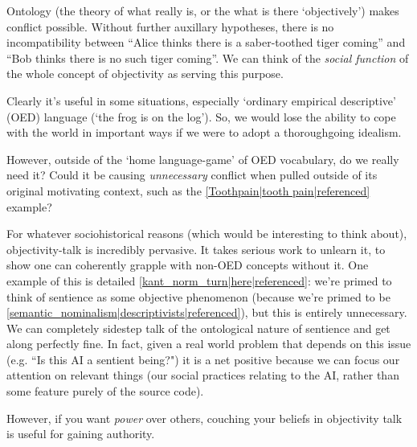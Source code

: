 Ontology (the theory of what really is, or the what is there `objectively') makes conflict possible. Without further auxillary hypotheses, there is no incompatibility between ``Alice thinks there is a saber-toothed tiger coming'' and ``Bob thinks there is no such tiger coming''. We can think of the \emph{social function} of the whole concept of objectivity as serving this purpose.

Clearly it's useful in some situations, especially `ordinary empirical descriptive' (OED) language (`the frog is on the log'). So, we would lose the ability to cope with the world in important ways if we were to adopt a thoroughgoing idealism.

However, outside of the `home language-game' of OED vocabulary, do we really need it? Could it be causing \emph{unnecessary} conflict when pulled outside of its original motivating context, such as the \ref{Toothpain|tooth pain|referenced} example?

For whatever sociohistorical reasons (which would be interesting to think about), objectivity-talk is incredibly pervasive. It takes serious work to unlearn it, to show one can coherently grapple with non-OED concepts without it. One example of this is detailed \ref{kant_norm_turn|here|referenced}: we're primed to think of sentience as some objective phenomenon (because we're primed to be \ref{semantic_nominalism|descriptivists|referenced}), but this is entirely unnecessary. We can completely sidestep talk of the ontological nature of sentience and get along perfectly fine. In fact, given a real world problem that depends on this issue (e.g. ``Is this AI a sentient being?") it is a net positive because we can focus our attention on relevant things (our social practices relating to the AI, rather than some feature purely of the source code).

However, if you want \emph{power} over others, couching your beliefs in objectivity talk is useful for gaining authority.